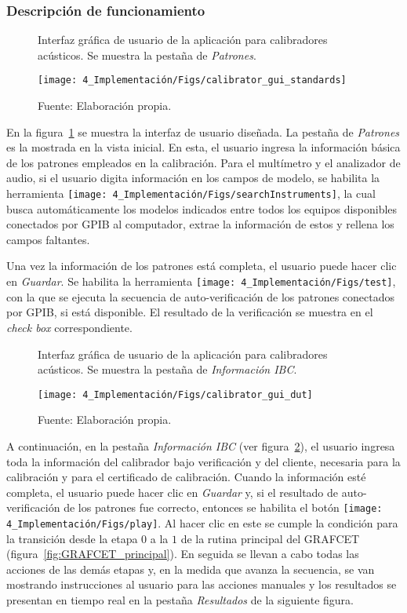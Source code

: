\subsubsection{Descripción de funcionamiento}
\begin{figure}[!hb]
    \centering
    \caption{Interfaz gráfica de usuario de la aplicación para calibradores acústicos. Se muestra la pestaña de \emph{Patrones}.}
    \label{fig:calibrator_gui_standards}
    \texttt{[image: 4\_Implementación/Figs/calibrator\_gui\_standards]}
    \caption*{\footnotesize Fuente: Elaboración propia.}
\end{figure}
%
En la figura~\ref{fig:calibrator_gui_standards} se muestra la interfaz de usuario diseñada.
La pestaña de \emph{Patrones} es la mostrada en la vista inicial.
En esta, el usuario ingresa la información básica de los patrones empleados en la calibración.
Para el multímetro y el analizador de audio, si el usuario digita información en los campos de modelo, se habilita la herramienta \texttt{[image: 4\_Implementación/Figs/searchInstruments]}, la cual busca automáticamente los modelos indicados entre todos los equipos disponibles conectados por GPIB al computador, extrae la información de estos y rellena los campos faltantes.

Una vez la información de los patrones está completa, el usuario puede hacer clic en \emph{Guardar}.
Se habilita la herramienta \texttt{[image: 4\_Implementación/Figs/test]}, con la que se ejecuta la secuencia de auto-verificación de los patrones conectados por GPIB, si está disponible.
El resultado de la verificación se muestra en el \emph{check box} correspondiente.

\begin{figure}[!h]
    \centering
    \caption{Interfaz gráfica de usuario de la aplicación para calibradores acústicos. Se muestra la pestaña de \emph{Información IBC}.}
    \label{fig:calibrator_gui_dut}
    \texttt{[image: 4\_Implementación/Figs/calibrator\_gui\_dut]}
    \caption*{\footnotesize Fuente: Elaboración propia.}
\end{figure}

A continuación, en la pestaña \emph{Información IBC} (ver figura~\ref{fig:calibrator_gui_dut}), el usuario ingresa toda la información del calibrador bajo verificación y del cliente, necesaria para la calibración y para el certificado de calibración.
Cuando la información esté completa, el usuario puede hacer clic en \emph{Guardar} y, si el resultado de auto-verificación de los patrones fue correcto, entonces se habilita el botón \texttt{[image: 4\_Implementación/Figs/play]}.
Al hacer clic en este se cumple la condición para la transición desde la etapa $0$ a la $1$ de la rutina principal del GRAFCET (figura~\ref{fig:GRAFCET_principal}).
En seguida se llevan a cabo todas las acciones de las demás etapas y, en la medida que avanza la secuencia, se van mostrando instrucciones al usuario para las acciones manuales y los resultados se presentan en tiempo real en la pestaña \emph{Resultados} de la siguiente figura.

